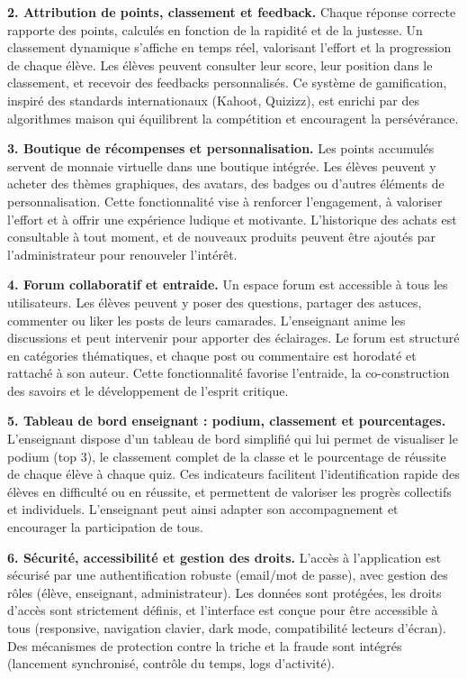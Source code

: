 \documentclass[a4paper,11pt]{report}
\begin{document}
\textbf{2. Attribution de points, classement et feedback.} Chaque réponse correcte rapporte des points, calculés en fonction de la rapidité et de la justesse. Un classement dynamique s'affiche en temps réel, valorisant l'effort et la progression de chaque élève. Les élèves peuvent consulter leur score, leur position dans le classement, et recevoir des feedbacks personnalisés. Ce système de gamification, inspiré des standards internationaux (Kahoot, Quizizz), est enrichi par des algorithmes maison qui équilibrent la compétition et encouragent la persévérance.

\textbf{3. Boutique de récompenses et personnalisation.} Les points accumulés servent de monnaie virtuelle dans une boutique intégrée. Les élèves peuvent y acheter des thèmes graphiques, des avatars, des badges ou d'autres éléments de personnalisation. Cette fonctionnalité vise à renforcer l'engagement, à valoriser l'effort et à offrir une expérience ludique et motivante. L'historique des achats est consultable à tout moment, et de nouveaux produits peuvent être ajoutés par l'administrateur pour renouveler l'intérêt.

\textbf{4. Forum collaboratif et entraide.} Un espace forum est accessible à tous les utilisateurs. Les élèves peuvent y poser des questions, partager des astuces, commenter ou liker les posts de leurs camarades. L'enseignant anime les discussions et peut intervenir pour apporter des éclairages. Le forum est structuré en catégories thématiques, et chaque post ou commentaire est horodaté et rattaché à son auteur. Cette fonctionnalité favorise l'entraide, la co-construction des savoirs et le développement de l'esprit critique.

\textbf{5. Tableau de bord enseignant : podium, classement et pourcentages.} L'enseignant dispose d'un tableau de bord simplifié qui lui permet de visualiser le podium (top 3), le classement complet de la classe et le pourcentage de réussite de chaque élève à chaque quiz. Ces indicateurs facilitent l'identification rapide des élèves en difficulté ou en réussite, et permettent de valoriser les progrès collectifs et individuels. L'enseignant peut ainsi adapter son accompagnement et encourager la participation de tous.

\textbf{6. Sécurité, accessibilité et gestion des droits.} L'accès à l'application est sécurisé par une authentification robuste (email/mot de passe), avec gestion des rôles (élève, enseignant, administrateur). Les données sont protégées, les droits d'accès sont strictement définis, et l'interface est conçue pour être accessible à tous (responsive, navigation clavier, dark mode, compatibilité lecteurs d'écran). Des mécanismes de protection contre la triche et la fraude sont intégrés (lancement synchronisé, contrôle du temps, logs d'activité).
\end{document}
